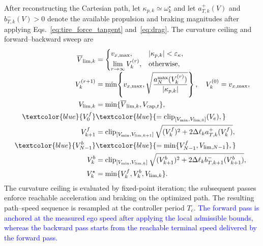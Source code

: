 After reconstructing the Cartesian path, let
$\kappa_{p,k}\simeq\omega_k^\star$ and let $a_{T,k}^{+}(V)$ and
$b_{T,k}^{-}(V)>0$ denote the available propulsion and braking magnitudes after
applying Eqs.~\eqref{eq:tire_force_tangent} and~\eqref{eq:drag}. The curvature
ceiling and forward--backward sweep are
\begin{equation}
\begin{aligned}
\overline V_{{\rm lim},k}&=
\begin{cases}
v_{x,\max},&|\kappa_{p,k}|<\varepsilon_\kappa,\\
\displaystyle\lim_{r\to\infty}V_k^{(r)},&\text{otherwise},
\end{cases}\\[-1mm]
V_k^{(r+1)}&=\min\!\left\{v_{x,\max},
\sqrt{\frac{a_N^{\max}(V_k^{(r)})}{|\kappa_{p,k}|}}\right\},
\quad V_k^{(0)}=v_{x,\max},\\
V_{{\rm lim},k}&=\min\{\overline V_{{\rm lim},k},V_{{\rm cap},t}\},\\
\textcolor{blue}{V_0^f}
&\textcolor{blue}{=\operatorname{clip}_{[V_{\min},V_{{\rm lim},0}]}(V_e),}\\
V_{k+1}^{f}&=\operatorname{clip}_{[V_{\min},V_{{\rm lim},k+1}]}
\sqrt{(V_k^f)^2+2\Delta\ell_k a_{T,k}^{+}(V_k^f)},\\
\textcolor{blue}{V_{N-1}^b}
&\textcolor{blue}{=\min\{V_{N-1}^f,V_{{\rm lim},N-1}\},}\\
V_{k}^{b}&=\operatorname{clip}_{[V_{\min},V_{{\rm lim},k}]}
\sqrt{(V_{k+1}^b)^2+2\Delta\ell_k b_{T,k+1}^{-}(V_{k+1}^b)},\\
V_k^\star&=\min\{V_k^f,V_k^b,V_{{\rm lim},k}\}.
\end{aligned}
\label{eq:execution_speed_sweep}
\end{equation}
The curvature ceiling is evaluated by fixed-point iteration; the subsequent
passes enforce reachable acceleration and braking on the optimized path. The resulting
path--speed sequence is resampled at the controller period $T_c$.
\textcolor{blue}{The forward pass is anchored at the measured ego speed after
applying the local admissible bounds, whereas the backward pass starts from
the reachable terminal speed delivered by the forward pass.}

